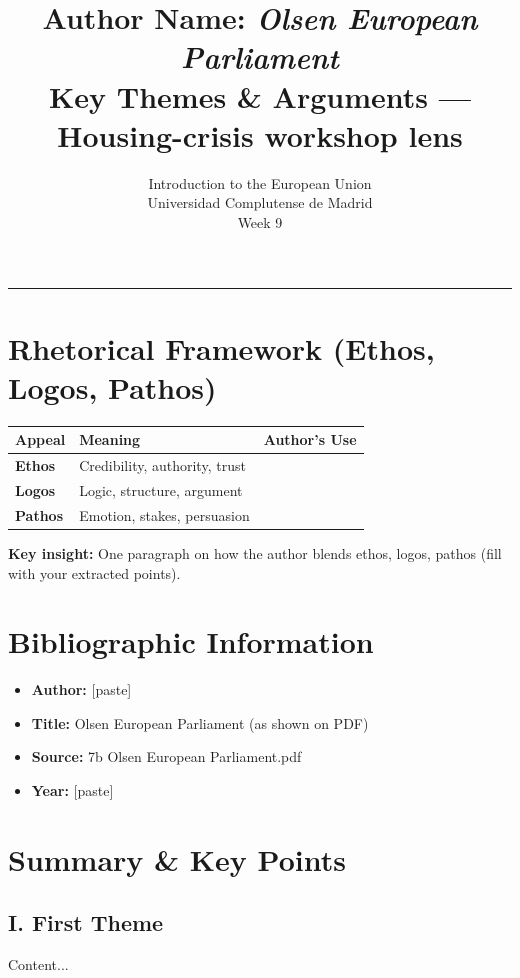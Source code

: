 \documentclass[11pt,a4paper]{article}
\begin{document}
\title{Author Name: \textit{Olsen European Parliament}\\Key Themes \& Arguments --- Housing-crisis workshop lens}
\author{Introduction to the European Union\\Universidad Complutense de Madrid\\Week 9}
\date{}
\maketitle
\vspace{-1em}
\hrule
\vspace{1em}

\section*{Rhetorical Framework (Ethos, Logos, Pathos)}
\begin{table}[h]
\centering
\begin{tabular}{@{}lll@{}}
\toprule
\textbf{Appeal} & \textbf{Meaning} & \textbf{Author's Use} \\
\midrule
\textbf{Ethos} & Credibility, authority, trust & \\
\textbf{Logos} & Logic, structure, argument & \\
\textbf{Pathos} & Emotion, stakes, persuasion & \\
\bottomrule
\end{tabular}
\end{table}

\textbf{Key insight:} One paragraph on how the author blends ethos, logos, pathos (fill with your extracted points).

\section*{Bibliographic Information}
\begin{itemize}
\item \textbf{Author:} [paste]
\item \textbf{Title:} Olsen European Parliament (as shown on PDF)
\item \textbf{Source:} 7b Olsen European Parliament.pdf
\item \textbf{Year:} [paste]
\end{itemize}

\section*{Summary & Key Points}
\subsection*{I. First Theme}
Content...
\end{document}
